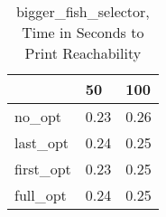 \begin{table}
\caption{bigger\_fish\_selector, Time in Seconds to Print Reachability}
\label{bigger_fish_selector_states_time}
\begin{tabular}{lll}
\toprule
 & 50 & 100 \\
\midrule
no\_opt & 0.23 & 0.26 \\
last\_opt & 0.24 & 0.25 \\
first\_opt & 0.23 & 0.25 \\
full\_opt & 0.24 & 0.25 \\
\bottomrule
\end{tabular}
\end{table}
